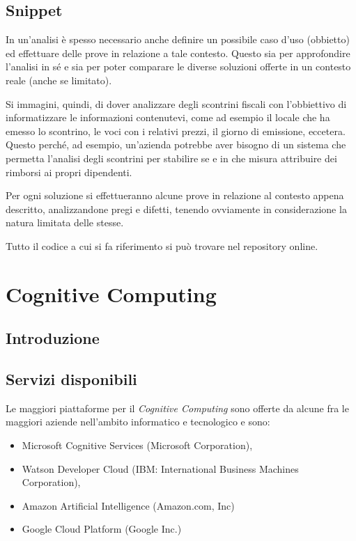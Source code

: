 \documentclass[fleqn,a4paper,11pt]{report}
\begin{document}
\section{Snippet}
In un'analisi è spesso necessario anche definire un possibile caso d'uso (obbietto) ed effettuare delle prove in relazione a tale contesto. Questo sia per approfondire l'analisi in sé e sia per poter comparare le diverse soluzioni offerte in un contesto reale (anche se limitato).

Si immagini, quindi, di dover analizzare degli scontrini fiscali con l'obbiettivo di informatizzare le informazioni contenutevi, come ad esempio il locale che ha emesso lo scontrino, le voci con i relativi prezzi, il giorno di emissione, eccetera.
Questo perché, ad esempio, un'azienda potrebbe aver bisogno di un sistema che permetta l'analisi degli scontrini per stabilire se e in che misura attribuire dei rimborsi ai propri dipendenti.

Per ogni soluzione si effettueranno alcune prove in relazione al contesto appena descritto, analizzandone pregi e difetti, tenendo ovviamente in considerazione la natura limitata delle stesse.

Tutto il codice a cui si fa riferimento si può trovare nel repository online\cite{ai-repo}.


{\let\clearpage\relax \chapter{Cognitive Computing}}
\section{Introduzione}

\section{Servizi disponibili}
Le maggiori piattaforme per il \textit{Cognitive Computing} sono offerte da alcune fra le maggiori aziende nell'ambito informatico e tecnologico e sono:
\begin{itemize}
\item Microsoft Cognitive Services \cite{mcs-link} (Microsoft Corporation),
\item Watson Developer Cloud \cite{ibm-link} (IBM: International Business Machines Corporation),
\item Amazon Artificial Intelligence \cite{amazon-link} (Amazon.com, Inc)
\item Google Cloud Platform (Google Inc.)
\end{itemize}
\end{document}
